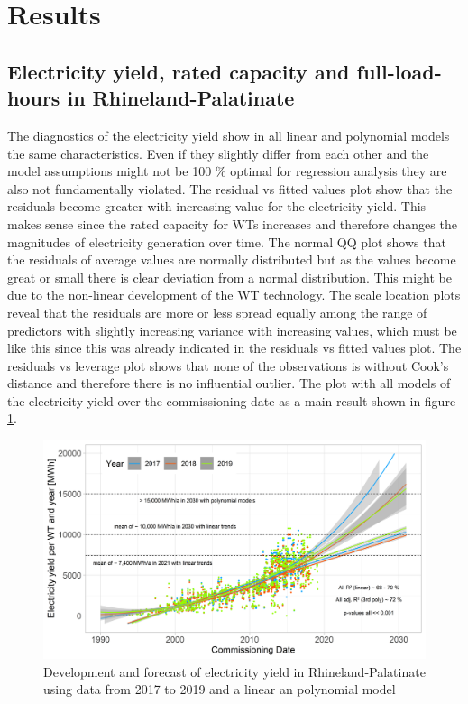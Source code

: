 \documentclass[a4paper,11pt]{article}
\begin{document}
\newpage

\hypertarget{results}{%
\section{Results}\label{results}}

\hypertarget{electricity-yield-rated-capacity-and-full-load-hours-in-rhineland-palatinate}{%
\subsection{Electricity yield, rated capacity and full-load-hours in Rhineland-Palatinate}\label{electricity-yield-rated-capacity-and-full-load-hours-in-rhineland-palatinate}}

The diagnostics of the electricity yield show in all linear and polynomial models the same characteristics. Even if they slightly differ from each other and the model assumptions might not be 100 \% optimal for regression analysis they are also not fundamentally violated. The residual vs fitted values plot show that the residuals become greater with increasing value for the electricity yield. This makes sense since the rated capacity for WTs increases and therefore changes the magnitudes of electricity generation over time. The normal QQ plot shows that the residuals of average values are normally distributed but as the values become great or small there is clear deviation from a normal distribution. This might be due to the non-linear development of the WT technology. The scale location plots reveal that the residuals are more or less spread equally among the range of predictors with slightly increasing variance with increasing values, which must be like this since this was already indicated in the residuals vs fitted values plot. The residuals vs leverage plot shows that none of the observations is without Cook's distance and therefore there is no influential outlier. The plot with all models of the electricity yield over the commissioning date as a main result shown in figure \ref{fig:electricityyield}.
\begin{figure}

{\centering \includegraphics[width=1\linewidth]{data/Amprion/results_of_analysis/electricity_yield_2017-2019} 

}

\caption{Development and forecast of electricity yield in Rhineland-Palatinate using data from 2017 to 2019 and a linear an polynomial model}\label{fig:electricityyield}
\end{figure}
\end{document}
